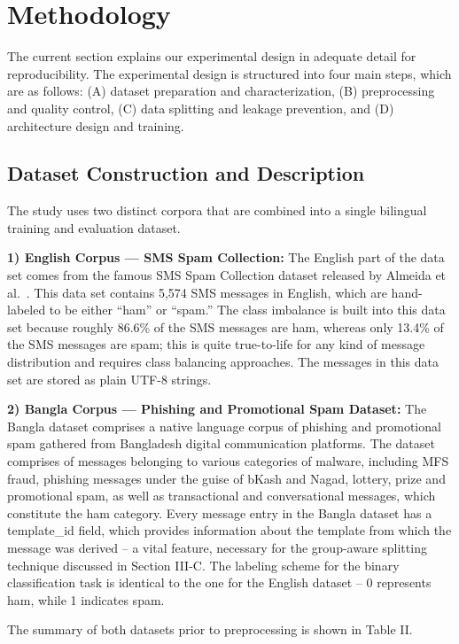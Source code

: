 \documentclass[journal]{IEEEtran}
\begin{document}
\section{Methodology}

The current section explains our experimental design in adequate detail for reproducibility. The experimental design is structured into four main steps, which are as follows: (A) dataset preparation and characterization, (B) preprocessing and quality control, (C) data splitting and leakage prevention, and (D) architecture design and training.

\subsection{Dataset Construction and Description}

The study uses two distinct corpora that are combined into a single
bilingual training and evaluation dataset.

\textbf{1) English Corpus --- SMS Spam Collection:} The English part of the
data set comes from the famous SMS Spam Collection dataset released by
Almeida et al.~\cite{ref1}. This data set contains 5,574 SMS messages in
English, which are hand-labeled to be either ``ham'' or ``spam.'' The class
imbalance is built into this data set because roughly 86.6\% of the SMS
messages are ham, whereas only 13.4\% of the SMS messages are spam; this
is quite true-to-life for any kind of message distribution and requires
class balancing approaches. The messages in this data set are stored as
plain UTF-8 strings.

\textbf{2) Bangla Corpus --- Phishing and Promotional Spam Dataset:} The
Bangla dataset comprises a native language corpus of phishing and
promotional spam gathered from Bangladesh digital communication
platforms. The dataset comprises of messages belonging to various
categories of malware, including MFS fraud, phishing messages under the
guise of bKash and Nagad, lottery, prize and promotional spam, as well
as transactional and conversational messages, which constitute the ham
category. Every message entry in the Bangla dataset has a template\_id
field, which provides information about the template from which the
message was derived -- a vital feature, necessary for the group-aware
splitting technique discussed in Section III-C. The labeling scheme for
the binary classification task is identical to the one for the English
dataset -- 0 represents ham, while 1 indicates spam.

The summary of both datasets prior to preprocessing is shown in Table
II.
\end{document}
